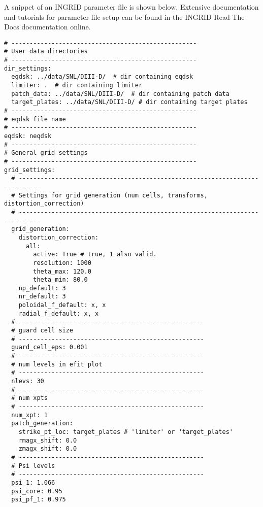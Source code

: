 \onecolumngrid
A snippet of an INGRID parameter file is shown below. Extensive documentation and tutorials for parameter file setup can be found in the INGRID Read The Docs documentation online.
\begin{lstlisting}[basicstyle=\small, aboveskip=\bigskipamount, frame=single, captionpos=b, caption={Snippet of YAML formatted configuration file. YAML files utilize Python formatted comments, keyword-value mappings, and nesting of structures via indentation.}]
# ---------------------------------------------------
# User data directories
# ---------------------------------------------------
dir_settings:
  eqdsk: ../data/SNL/DIII-D/  # dir containing eqdsk
  limiter: .  # dir containing limiter
  patch_data: ../data/SNL/DIII-D/  # dir containing patch data
  target_plates: ../data/SNL/DIII-D/ # dir containing target plates
# ---------------------------------------------------
# eqdsk file name
# ---------------------------------------------------
eqdsk: neqdsk
# ---------------------------------------------------
# General grid settings
# ---------------------------------------------------
grid_settings:
  # ----------------------------------------------------------------------------
  # Settings for grid generation (num cells, transforms, distortion_correction)
  # ----------------------------------------------------------------------------
  grid_generation:
    distortion_correction:
      all:
        active: True # true, 1 also valid.
        resolution: 1000
        theta_max: 120.0
        theta_min: 80.0
    np_default: 3
    nr_default: 3
    poloidal_f_default: x, x
    radial_f_default: x, x
  # ---------------------------------------------------
  # guard cell size
  # ---------------------------------------------------
  guard_cell_eps: 0.001
  # ---------------------------------------------------
  # num levels in efit plot
  # ---------------------------------------------------
  nlevs: 30
  # ---------------------------------------------------
  # num xpts
  # ---------------------------------------------------
  num_xpt: 1
  patch_generation:
    strike_pt_loc: target_plates # 'limiter' or 'target_plates'
    rmagx_shift: 0.0
    zmagx_shift: 0.0
  # ---------------------------------------------------
  # Psi levels
  # ---------------------------------------------------
  psi_1: 1.066
  psi_core: 0.95
  psi_pf_1: 0.975

\end{lstlisting}
